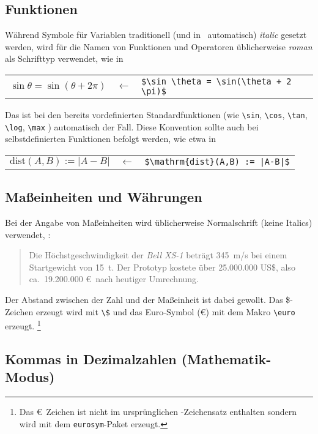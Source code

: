 \subsection{Funktionen}

Während Symbole für Variablen traditionell (und in \latex\ automatisch) \emph{italic} gesetzt werden, wird für die Namen von Funktionen und Operatoren üblicherweise
\emph{roman} als Schrifttyp verwendet, wie \zB in
\begin{center}
\begin{tabular}{lcl}
	$\sin \theta = \sin(\theta + 2 \pi)$ & 
	$\leftarrow$ & \verb!$\sin \theta = \sin(\theta + 2 \pi)$! \\
	\end{tabular}
\end{center}
Das ist bei den bereits vordefinierten Standardfunktionen (wie
\verb!\sin!,
\verb!\cos!,
\verb!\tan!,
\verb!\log!,
\verb!\max!
\uva) automatisch der Fall.
Diese Konvention sollte auch bei selbstdefinierten Funktionen befolgt werden,
wie etwa in
\begin{center}
	\begin{tabular}{lcl}
	$\mathrm{dist}(A,B) := |A-B|$ & $\leftarrow$ & 
	\verb!$\mathrm{dist}(A,B) := |A-B|$! \\
	\end{tabular}
\end{center}


\subsection{Maßeinheiten und Währungen}

Bei der Angabe von Maßeinheiten wird üblicherweise Normalschrift
(keine Italics) verwendet, \zB:
\begin{quote}
Die Höchstgeschwindigkeit der \textit{Bell XS-1} beträgt 345~m/s
bei einem Startgewicht von 15~t. 
Der Prototyp kostete über 25.000.000 US\$, also ca.\ 19.200.000 \euro\ nach heutiger Umrechnung.
\end{quote}
Der Abstand zwischen der Zahl und der Maßeinheit ist dabei
gewollt.
Das \$-Zeichen erzeugt wird mit \verb!\$! und
das Euro-Symbol (\euro) mit dem Makro \verb!\euro! erzeugt.%
\footnote{Das \euro\ Zeichen ist nicht im ursprünglichen \latex-Zeichensatz enthalten
sondern wird mit dem \texttt{eurosym}-Paket erzeugt.}


\subsection{Kommas in Dezimalzahlen (Mathematik-Modus)}

